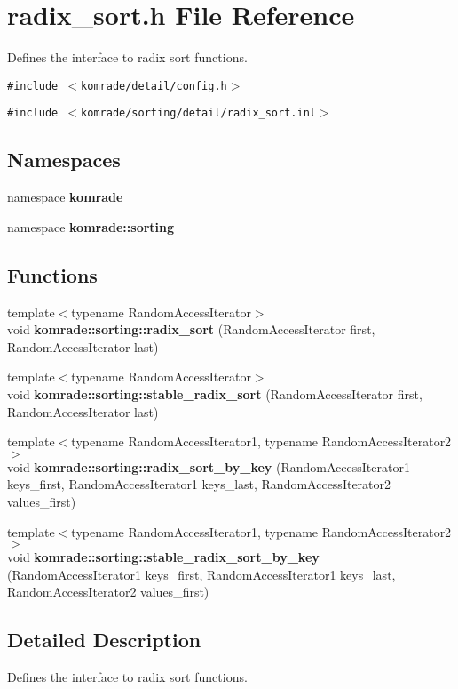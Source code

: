\section{radix\_\-sort.h File Reference}
\label{radix__sort_8h}
Defines the interface to radix sort functions. 

{\tt \#include $<$komrade/detail/config.h$>$}\par
{\tt \#include $<$komrade/sorting/detail/radix\_\-sort.inl$>$}\par
\subsection*{Namespaces}
\begin{CompactItemize}
\item 
namespace {\bf komrade}
\item 
namespace {\bf komrade::sorting}
\end{CompactItemize}
\subsection*{Functions}
\begin{CompactItemize}
\item 
{\footnotesize template$<$typename RandomAccessIterator$>$ }\\void {\bf komrade::sorting::radix\_\-sort} (RandomAccessIterator first, RandomAccessIterator last)
\item 
{\footnotesize template$<$typename RandomAccessIterator$>$ }\\void {\bf komrade::sorting::stable\_\-radix\_\-sort} (RandomAccessIterator first, RandomAccessIterator last)
\item 
{\footnotesize template$<$typename RandomAccessIterator1, typename RandomAccessIterator2$>$ }\\void {\bf komrade::sorting::radix\_\-sort\_\-by\_\-key} (RandomAccessIterator1 keys\_\-first, RandomAccessIterator1 keys\_\-last, RandomAccessIterator2 values\_\-first)
\item 
{\footnotesize template$<$typename RandomAccessIterator1, typename RandomAccessIterator2$>$ }\\void {\bf komrade::sorting::stable\_\-radix\_\-sort\_\-by\_\-key} (RandomAccessIterator1 keys\_\-first, RandomAccessIterator1 keys\_\-last, RandomAccessIterator2 values\_\-first)
\end{CompactItemize}


\subsection{Detailed Description}
Defines the interface to radix sort functions. 

